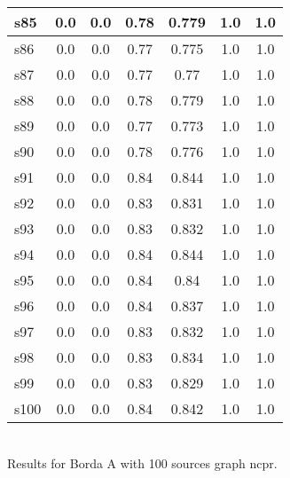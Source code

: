 \documentclass{article}
\begin{document}
\begin{tabular}{|l|c|c|c|c|c|c|}
\hline
s85 &0.0 & 0.0 & 0.78 & 0.779 & 1.0 & 1.0\\
\hline
s86 &0.0 & 0.0 & 0.77 & 0.775 & 1.0 & 1.0\\
\hline
s87 &0.0 & 0.0 & 0.77 & 0.77 & 1.0 & 1.0\\
\hline
s88 &0.0 & 0.0 & 0.78 & 0.779 & 1.0 & 1.0\\
\hline
s89 &0.0 & 0.0 & 0.77 & 0.773 & 1.0 & 1.0\\
\hline
s90 &0.0 & 0.0 & 0.78 & 0.776 & 1.0 & 1.0\\
\hline
s91 &0.0 & 0.0 & 0.84 & 0.844 & 1.0 & 1.0\\
\hline
s92 &0.0 & 0.0 & 0.83 & 0.831 & 1.0 & 1.0\\
\hline
s93 &0.0 & 0.0 & 0.83 & 0.832 & 1.0 & 1.0\\
\hline
s94 &0.0 & 0.0 & 0.84 & 0.844 & 1.0 & 1.0\\
\hline
s95 &0.0 & 0.0 & 0.84 & 0.84 & 1.0 & 1.0\\
\hline
s96 &0.0 & 0.0 & 0.84 & 0.837 & 1.0 & 1.0\\
\hline
s97 &0.0 & 0.0 & 0.83 & 0.832 & 1.0 & 1.0\\
\hline
s98 &0.0 & 0.0 & 0.83 & 0.834 & 1.0 & 1.0\\
\hline
s99 &0.0 & 0.0 & 0.83 & 0.829 & 1.0 & 1.0\\
\hline
s100 &0.0 & 0.0 & 0.84 & 0.842 & 1.0 & 1.0\\
\hline
\end{tabular}\\

\noindent Results for Borda A with 100 sources graph ncpr.
\end{document}
